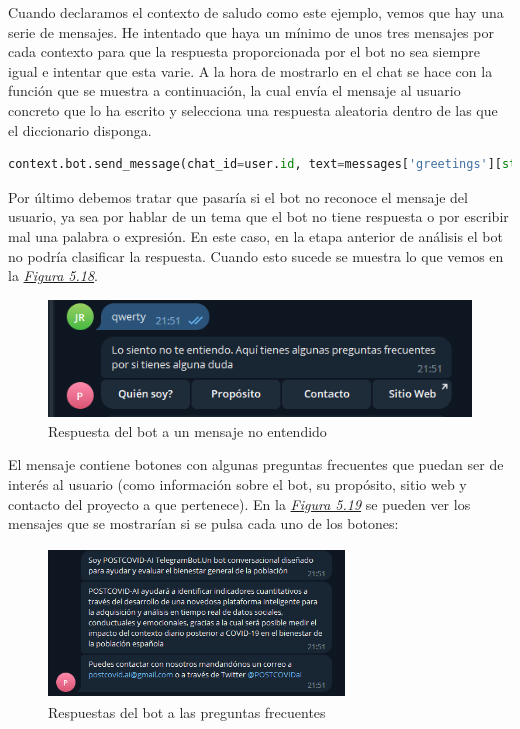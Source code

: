 Cuando declaramos el contexto de saludo como este ejemplo, vemos que hay una serie de mensajes. He intentado que haya un mínimo de unos tres mensajes por cada contexto para que la respuesta proporcionada por el bot no sea siempre igual e intentar que esta varie. A la hora de mostrarlo en el chat se hace con la función que se muestra a continuación, la cual envía el mensaje al usuario concreto que lo ha escrito y selecciona una respuesta aleatoria dentro de las que el diccionario disponga.\vspace{0.3cm}

\begin{lstlisting}[language=Python]
context.bot.send_message(chat_id=user.id, text=messages['greetings'][str(random_var)])
\end{lstlisting}

Por último debemos tratar que pasaría si el bot no reconoce el mensaje del usuario, ya sea por hablar de un tema que el bot no tiene respuesta o por escribir mal una palabra o expresión. En este caso, en la etapa anterior de análisis el bot no podría clasificar la respuesta. Cuando esto sucede se muestra lo que vemos en la \textit{\hyperref[fig:no-entendido]{Figura 5.18}}.

\begin{figure}[!ht]
    \centering
    \includegraphics[width=1\textwidth]{imagenes/no_respuesta.png}
    \caption{Respuesta del bot a un mensaje no entendido}
    \label{fig:no-entendido}
\end{figure}\vspace{0.3cm}

El mensaje contiene botones con algunas preguntas frecuentes que puedan ser de interés al usuario (como información sobre el bot, su propósito, sitio web y contacto del proyecto a que pertenece). En la \textit{\hyperref[fig:faq]{Figura 5.19}} se pueden ver los mensajes que se mostrarían si se pulsa cada uno de los botones:

\begin{figure}[!ht]
    \centering
    \includegraphics[width=0.7\textwidth, height=4cm]{imagenes/preguntas_frecuentes.png}
    \caption{ Respuestas del bot a las preguntas frecuentes }
    \label{fig:faq}
\end{figure}


